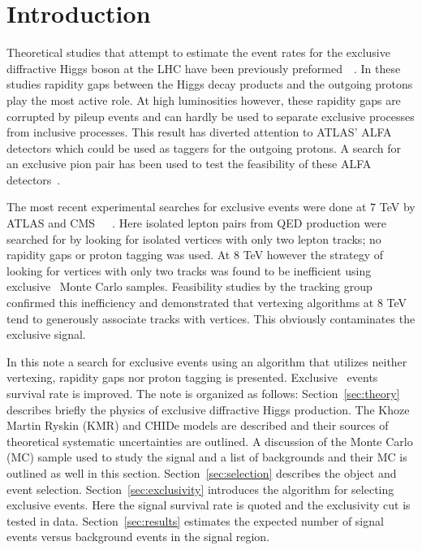 \clearpage
\section{Introduction}
\label{sec:introduction}

\par Theoretical studies that attempt to
estimate the event rates for the exclusive diffractive Higgs boson at
the LHC have been previously preformed~\cite{Hdijet}~\cite{canLHC}. 
In these studies rapidity gaps between
the Higgs decay products and the outgoing protons play the most active
role. At high luminosities however, these rapidity gaps are corrupted
by pileup events and can hardly be used to separate exclusive processes from 
inclusive processes. This result has diverted attention to ATLAS' ALFA detectors
which could be used as taggers for the outgoing protons. A search for an
exclusive pion pair has been used to test the feasibility of these ALFA 
detectors~\cite{pionPair}. 
 
\par The most recent experimental searches for exclusive events were done
 at 7 TeV by ATLAS and CMS~\cite{CMSmumu}~\cite{CMSee}~\cite{MonteNote}.
Here isolated lepton pairs from QED production were searched for by looking 
for isolated vertices with only two lepton tracks; no rapidity gaps or 
proton tagging was used. At 8 TeV however the strategy of looking for 
vertices with only two tracks was found to be inefficient using exclusive 
\HWWll\ Monte Carlo samples. Feasibility studies by the tracking group confirmed 
this inefficiency and demonstrated that vertexing algorithms at 8 TeV 
tend to generously associate tracks with vertices. This obviously contaminates the exclusive signal.  

\par In this note a search for exclusive events using an 
algorithm that utilizes neither vertexing, rapidity gaps nor proton tagging is presented. 
Exclusive \HWWll\ events survival rate is improved. 
The note is organized as follows: Section~\ref{sec:theory} 
describes briefly the physics of exclusive diffractive Higgs production.
The Khoze Martin Ryskin (KMR) and CHIDe models are described and their 
sources of theoretical systematic uncertainties are outlined. A discussion of 
the Monte Carlo (MC) sample used to study the signal and a list of backgrounds 
and their MC is outlined as well in this section. Section~\ref{sec:selection} 
describes the object and event selection. Section~\ref{sec:exclusivity} 
introduces the algorithm for selecting exclusive events. Here the signal 
survival rate is quoted and the exclusivity cut is tested in data. Section~\ref{sec:results} 
estimates the expected number of signal events versus background events 
in the signal region.   
